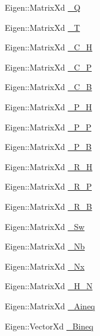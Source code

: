 \begin{DoxyCompactItemize}
\item 
\-Eigen\-::\-Matrix\-Xd \hyperlink{classMIQPController_ac6404f74d6002d6a0ca4bd2d0b41d548}{\-\_\-\-Q}
\item 
\-Eigen\-::\-Matrix\-Xd \hyperlink{classMIQPController_a1143455ae85d0e221578dbe5d659af1d}{\-\_\-\-T}
\item 
\-Eigen\-::\-Matrix\-Xd \hyperlink{classMIQPController_a323718c0eaf8c8a7e159ea7f1ef5b72c}{\-\_\-\-C\-\_\-\-H}
\item 
\-Eigen\-::\-Matrix\-Xd \hyperlink{classMIQPController_a17cf6f8279cf6b2ce333feb9c8fc5a5d}{\-\_\-\-C\-\_\-\-P}
\item 
\-Eigen\-::\-Matrix\-Xd \hyperlink{classMIQPController_a5c6882cb248e9d16513868fea7835d6e}{\-\_\-\-C\-\_\-\-B}
\item 
\-Eigen\-::\-Matrix\-Xd \hyperlink{classMIQPController_afb83c4fddc4adba989506ccc9b62ff1e}{\-\_\-\-P\-\_\-\-H}
\item 
\-Eigen\-::\-Matrix\-Xd \hyperlink{classMIQPController_a8243f4111abb4ad6c331ac147a844118}{\-\_\-\-P\-\_\-\-P}
\item 
\-Eigen\-::\-Matrix\-Xd \hyperlink{classMIQPController_a848852d659dff4a566a8dca57819587d}{\-\_\-\-P\-\_\-\-B}
\item 
\-Eigen\-::\-Matrix\-Xd \hyperlink{classMIQPController_a2207c17eb221166b1bc12fbca976035d}{\-\_\-\-R\-\_\-\-H}
\item 
\-Eigen\-::\-Matrix\-Xd \hyperlink{classMIQPController_a7cede44e7827c9b4b12f2549714f3adf}{\-\_\-\-R\-\_\-\-P}
\item 
\-Eigen\-::\-Matrix\-Xd \hyperlink{classMIQPController_a69fbc25a2e2f2392fe0f92c5811c12dd}{\-\_\-\-R\-\_\-\-B}
\item 
\-Eigen\-::\-Matrix\-Xd \hyperlink{classMIQPController_ada92fc35065a11b889019f2948c1888d}{\-\_\-\-Sw}
\item 
\-Eigen\-::\-Matrix\-Xd \hyperlink{classMIQPController_aaed002a2578a0f83c4ee59516a793f98}{\-\_\-\-Nb}
\item 
\-Eigen\-::\-Matrix\-Xd \hyperlink{classMIQPController_aefaa7a13d0c690dafca85792bdbed4fd}{\-\_\-\-Nx}
\item 
\-Eigen\-::\-Matrix\-Xd \hyperlink{classMIQPController_ab4b99d844add54fa7ad6ca6b80cab089}{\-\_\-\-H\-\_\-\-N}
\item 
\-Eigen\-::\-Matrix\-Xd \hyperlink{classMIQPController_a7678fd8e1c08986d7ae0dc1a884040e1}{\-\_\-\-Aineq}
\item 
\-Eigen\-::\-Vector\-Xd \hyperlink{classMIQPController_a02d441467a51e81e969163f096d3798a}{\-\_\-\-Bineq}

\end{DoxyCompactItemize}
